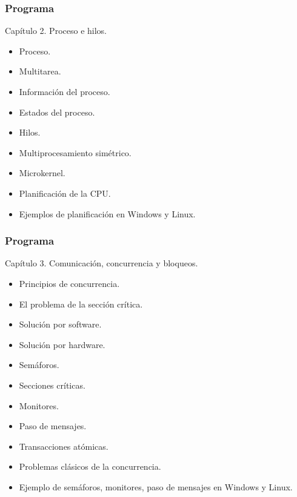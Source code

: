 \documentclass[xcolor=svgnames]{beamer}
\theoremstyle{example}
\begin{document}
\begin{frame}
  \frametitle{Programa}
  \begin{block}{Capítulo 2. Proceso e hilos.}
    \begin{itemize}%
    \item Proceso.
    \item Multitarea.
    \item Información del proceso.
    \item Estados del proceso.
    \item Hilos.
    \item Multiprocesamiento simétrico.
    \item Microkernel.
    \item Planificación de la CPU.
    \item Ejemplos de planificación en Windows y Linux.
    \end{itemize}
  \end{block}
\end{frame}

\begin{frame}[shrink]
  \frametitle{Programa}
  \begin{block}{Capítulo 3. Comunicación, concurrencia y bloqueos.}
    \begin{itemize}%
    \item Principios de concurrencia.
    \item El problema de la sección crítica.
    \item Solución por software.
    \item Solución por hardware.
    \item Semáforos.
    \item Secciones críticas.
    \item Monitores.
    \item Paso de mensajes.
    \item Transacciones atómicas.
    \item Problemas clásicos de la concurrencia.
    \item Ejemplo de semáforos, monitores, paso de mensajes en
      Windows y Linux.
    \end{itemize}
  \end{block}
\end{frame}
\end{document}
